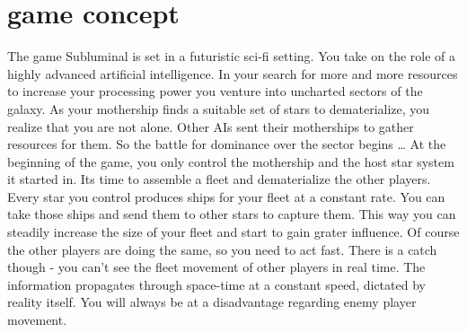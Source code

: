 \chapter*{game concept}
The game Subluminal is set in a futuristic sci-fi setting. You take on the role of a highly advanced artificial intelligence. In your search for more and more resources to increase your processing power you venture into uncharted sectors of the galaxy. As your mothership finds a suitable set of stars to dematerialize, you realize that you are not alone. Other AIs sent their motherships to gather resources for them. So the battle for dominance over the sector begins \ldots
At the beginning of the game, you only control the mothership and the host star system it started in. Its time to assemble a fleet and dematerialize the other players. Every star you control produces ships for your fleet at a constant rate. You can take those ships and send them to other stars to capture them. This way you can steadily increase the size of your fleet and start to gain grater influence. Of course the other players are doing the same, so you need to act fast. There is a catch though - you can't see the fleet movement of other players in real time. The information propagates through space-time at a constant speed, dictated by reality itself. You will always be at a disadvantage regarding enemy player movement. 